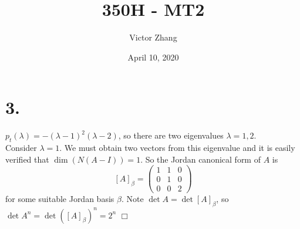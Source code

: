 \documentclass{article}
\title{350H - MT2}
\author{Victor Zhang}
\date{April 10, 2020}
\begin{document}
\maketitle

\section*{3.}
$p_t(\lambda) = -(\lambda-1)^2(\lambda - 2)$, so there are two eigenvalues $\lambda = 1,2$.\\
Consider $\lambda = 1$. We must obtain two vectors from this eigenvalue and it is easily verified that $\dim (N(A-I)) = 1$. So the Jordan canonical form of $A$ is
$$[A]_\beta = \left( \begin{matrix} 1 & 1 & 0 \\ 0 & 1 & 0 \\ 0 & 0 & 2 \end{matrix} \right)$$
for some suitable Jordan basis $\beta$. Note $\det A = \det [A]_\beta$, so $\det A^n = \det \left([A]_\beta\right)^n = 2^n$ $\Box$
\end{document}
